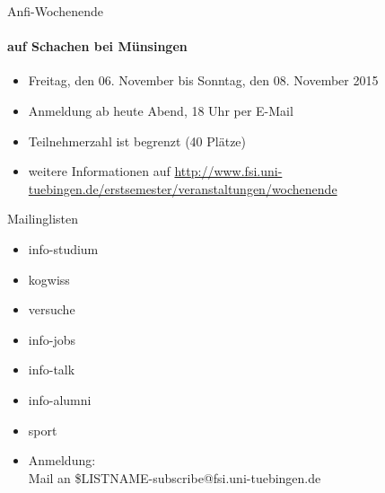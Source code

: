 \documentclass{beamer}
\begin{document}
	\begin{frame}{Anfi-Wochenende}
		\framesubtitle{auf Schachen bei Münsingen}
		\begin{itemize}
			\item Freitag, den 06. November bis Sonntag, den 08. November 2015
			\item Anmeldung ab heute Abend, 18 Uhr per E-Mail
			\item Teilnehmerzahl ist begrenzt (40 Plätze)
			\item weitere Informationen auf \url{http://www.fsi.uni-tuebingen.de/erstsemester/veranstaltungen/wochenende}
		\end{itemize}
	\end{frame}

	\begin{frame}[<+->]{Mailinglisten}
		\begin{itemize}
			\item info-studium
			\item kogwiss
			\item versuche
			\item info-jobs
			\item info-talk
			\item info-alumni
            \item sport
			\item Anmeldung:\\
				Mail an \$LISTNAME-subscribe@fsi.uni-tuebingen.de
		\end{itemize}
	\end{frame}
\end{document}
